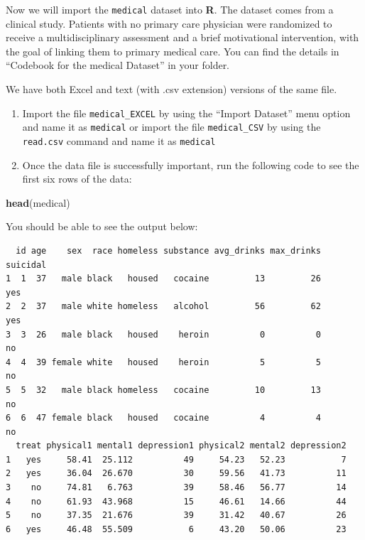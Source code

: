 \documentclass[]{book}
\newenvironment{Shaded}{\begin{snugshade}}{\end{snugshade}}
\newcommand{\KeywordTok}[1]{\textcolor[rgb]{0.13,0.29,0.53}{\textbf{#1}}}
\newcommand{\NormalTok}[1]{#1}
\begin{document}
Now we will import the \texttt{medical} dataset into \textbf{R}. The dataset comes from a clinical study. Patients with no primary care physician were randomized to receive a multidisciplinary assessment and a brief motivational intervention, with the goal of linking them to primary medical care. You can find the details in ``Codebook for the medical Dataset'' in your folder.

We have both Excel and text (with .csv extension) versions of the same file.

\begin{enumerate}
\def\labelenumi{\arabic{enumi}.}
\item
  Import the file \texttt{medical\_EXCEL} by using the ``Import Dataset'' menu option and name it as \texttt{medical} or import the file \texttt{medical\_CSV} by using the \texttt{read.csv} command and name it as \texttt{medical}
\item
  Once the data file is successfully important, run the following code to see the first six rows of the data:
\end{enumerate}

\begin{Shaded}
\begin{Highlighting}[]
\KeywordTok{head}\NormalTok{(medical)}
\end{Highlighting}
\end{Shaded}

You should be able to see the output below:

\begin{verbatim}
  id age    sex  race homeless substance avg_drinks max_drinks suicidal
1  1  37   male black   housed   cocaine         13         26      yes
2  2  37   male white homeless   alcohol         56         62      yes
3  3  26   male black   housed    heroin          0          0       no
4  4  39 female white   housed    heroin          5          5       no
5  5  32   male black homeless   cocaine         10         13       no
6  6  47 female black   housed   cocaine          4          4       no
  treat physical1 mental1 depression1 physical2 mental2 depression2
1   yes     58.41  25.112          49     54.23   52.23           7
2   yes     36.04  26.670          30     59.56   41.73          11
3    no     74.81   6.763          39     58.46   56.77          14
4    no     61.93  43.968          15     46.61   14.66          44
5    no     37.35  21.676          39     31.42   40.67          26
6   yes     46.48  55.509           6     43.20   50.06          23
\end{verbatim}
\end{document}
